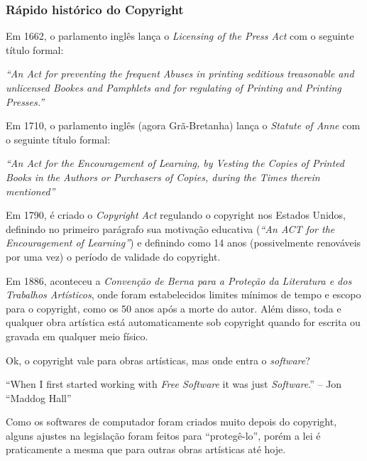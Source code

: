 \documentclass[serif,mathserif]{beamer}
\begin{document}
\begin{frame}
  \frametitle{Rápido histórico do Copyright}
  Em 1662, o parlamento inglês lança o \emph{Licensing of the Press Act} com o seguinte título formal: \pause

  \textit{``An Act for preventing the frequent Abuses in \alert<3>{printing} seditious treasonable and unlicensed Bookes and Pamphlets and for regulating of \alert<3>{Printing} and \alert<3>{Printing Presses}.''}\pause

  \pause

  \vspace{5mm} %
  Em 1710, o parlamento inglês (agora Grã-Bretanha) lança o \emph{Statute of Anne} com o seguinte título formal: \pause

  \textit{``An Act for the \alert<6>{Encouragement of Learning}, by Vesting the Copies of Printed Books in the Authors or Purchasers of Copies, during the Times therein mentioned''}
  \pause

\end{frame}

\begin{frame}
  Em 1790, é criado o \emph{Copyright Act} regulando o copyright nos Estados Unidos, definindo no primeiro parágrafo sua motivação educativa (\textit{``An \emph{ACT} for the \emph{Encouragement} of \emph{Learning}''}) e definindo como 14 anos (possivelmente renováveis por uma vez) o período de validade do copyright.\pause

  \vspace{5mm} %
  Em 1886, aconteceu a \emph{Convenção de Berna para a Proteção da Literatura e dos Trabalhos Artísticos}, onde foram
  estabelecidos limites mínimos de tempo e escopo para o copyright, como os 50 anos após a morte do autor. Além disso,
  toda e qualquer obra artística está automaticamente sob copyright quando for escrita ou gravada em qualquer meio físico.

\end{frame}

\begin{frame}
  Ok, o copyright vale para obras artísticas, mas onde entra o \emph{software}? \pause

  \vspace{5mm} %
  ``When I first started working with \emph{Free Software} it was just \emph{Software}.'' -- Jon ``Maddog Hall'' \pause

  \vspace{5mm} %
  Como os softwares de computador foram criados muito depois do copyright, alguns ajustes na legislação foram feitos
  para ``protegê-lo'', porém a lei é praticamente a mesma que para outras obras artísticas até hoje.
\end{frame}
\end{document}
